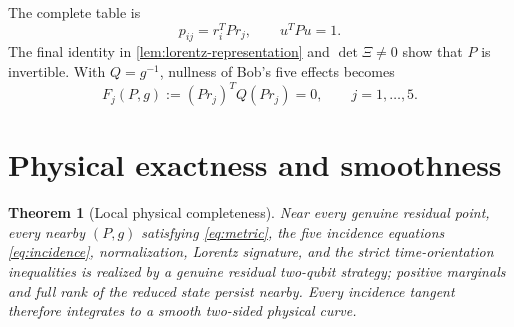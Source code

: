 \documentclass[11pt]{article}
\newtheorem{theorem}{Theorem}[section]
\theoremstyle{definition}
\begin{document}
The complete table is
\[
p_{ij}=r_i^TPr_j,\qquad u^TPu=1.
\]
The final identity in \cref{lem:lorentz-representation} and
\(\det\Xi\ne0\) show that \(P\) is invertible. With \(Q=g^{-1}\), nullness
of Bob's five effects becomes
\begin{equation}
\label{eq:incidence}
F_j(P,g):=(Pr_j)^TQ(Pr_j)=0,\qquad j=1,\ldots,5.
\end{equation}

\section{Physical exactness and smoothness}
\label{sec:physical}

\begin{theorem}[Local physical completeness]
\label{thm:physical-completeness}
Near every genuine residual point, every nearby \((P,g)\) satisfying
\eqref{eq:metric}, the five incidence equations \eqref{eq:incidence},
normalization, Lorentz signature, and the strict time-orientation inequalities
is realized by a genuine residual two-qubit strategy; positive marginals and
full rank of the reduced state persist nearby. Every incidence tangent
therefore integrates to a smooth two-sided physical curve.
\end{theorem}
\end{document}
